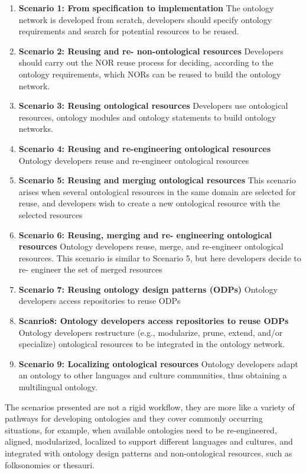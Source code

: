 \begin{enumerate}
    \item \textbf{Scenario 1: From specification to implementation} The ontology network is developed from scratch, developers should specify ontology requirements and search for potential resources to be reused. 

    \item \textbf{Scenario 2: Reusing and re- non-ontological resources}  Developers should carry out the NOR reuse process for deciding, according to the ontology requirements, which NORs can be  reused to build the ontology network. 

    \item \textbf{Scenario 3: Reusing ontological resources} Developers use ontological resources, ontology modules and ontology statements to build ontology networks. 

    \item \textbf{Scenario 4: Reusing and re-engineering ontological resources} Ontology developers reuse and re-engineer ontological resources

    \item \textbf{Scenario 5: Reusing and merging ontological resources} This scenario arises when several ontological resources in the same domain are selected for reuse, and developers wish to create a new ontological resource with the selected resources

    \item \textbf{Scenario 6: Reusing, merging and re- engineering ontological resources} Ontology developers reuse, merge, and re-engineer ontological resources. This scenario is similar to Scenario 5, but here developers decide to re- engineer the set of merged resources

    \item  \textbf{Scenario 7: Reusing ontology design patterns (ODPs)} Ontology developers access repositories to reuse ODPs

    \item \textbf{Scanrio8: Ontology developers access repositories to reuse ODPs} Ontology developers restructure (e.g., modularize, prune, extend, and/or specialize) ontological resources to be  integrated in the ontology network. 

    \item \textbf{Scenario 9: Localizing ontological resources} Ontology developers adapt an ontology to other languages and culture communities, thus obtaining a multilingual ontology.

\end{enumerate}
The scenarios presented are not a rigid workflow, they are more like a variety of pathways for developing ontologies and they  cover commonly occurring situations, for example, when available ontologies need to be re-engineered, aligned, modularized, localized to support different languages and cultures, and integrated with ontology design patterns and non-ontological resources, such as folksonomies or thesauri.\cite{suarez2011neon}\\

